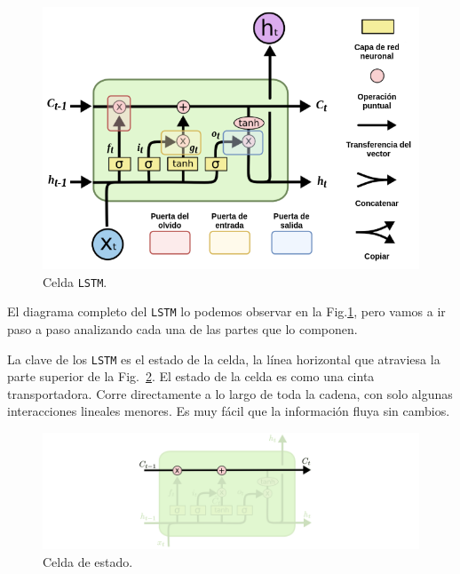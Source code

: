 \documentclass[a4paper,12pt]{article}
\begin{document}
\begin{figure}[H]
	\begin{center}				
	\includegraphics[width=1\textwidth]{lstmcell5.png}
  	\caption{Celda \texttt{LSTM}.}
  	\label{fig:lstmcell}
  	\end{center}
\end{figure}

El diagrama completo del \texttt{LSTM} lo podemos observar en la Fig.\ref{fig:lstmcell}, pero vamos a ir paso a paso analizando cada una de las partes que lo componen.

La clave de los \texttt{LSTM} es el estado de la celda, la línea horizontal que atraviesa la parte superior de la Fig.~\ref{fig:lstm1}. El estado de la celda es como una cinta transportadora. Corre directamente a lo largo de toda la cadena, con solo algunas interacciones lineales menores. Es muy fácil que la información fluya sin cambios.

\begin{figure}[H]
	\begin{center}				
	\includegraphics[width=1\textwidth]{lstm1.png}
  	\caption{Celda de estado.}
  	\label{fig:lstm1}
  	\end{center}
\end{figure}
\end{document}
